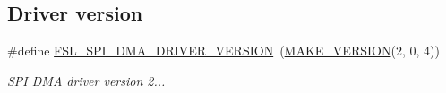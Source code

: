 \subsection*{Driver version}
\begin{DoxyCompactItemize}
\item 
\mbox{\label{group__spi__dma__driver_gab72873a3a11fc293023558be553de43c}} 
\#define \mbox{\hyperlink{group__spi__dma__driver_gab72873a3a11fc293023558be553de43c}{F\+S\+L\+\_\+\+S\+P\+I\+\_\+\+D\+M\+A\+\_\+\+D\+R\+I\+V\+E\+R\+\_\+\+V\+E\+R\+S\+I\+ON}}~(\mbox{\hyperlink{group__ftfx__utilities_ga812138aa3315b0c6953c1a26130bcc37}{M\+A\+K\+E\+\_\+\+V\+E\+R\+S\+I\+ON}}(2, 0, 4))
\begin{DoxyCompactList}\small\item\em S\+PI D\+MA driver version 2... \end{DoxyCompactList}\end{DoxyCompactItemize}

